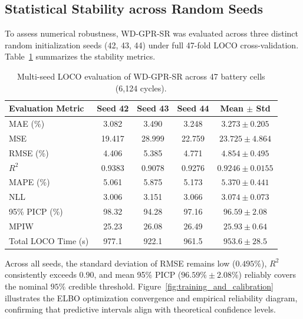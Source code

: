 \documentclass[a4paper,fleqn]{cas-sc}
\begin{document}
\subsection{Statistical Stability across Random Seeds}
To assess numerical robustness, WD-GPR-SR was evaluated across three distinct random initialization seeds (42, 43, 44) under full 47-fold LOCO cross-validation. Table~\ref{tab:seed_metrics} summarizes the stability metrics.

\begin{table}[htbp]
\centering
\caption{Multi-seed LOCO evaluation of WD-GPR-SR across 47 battery cells (6,124 cycles).}
\label{tab:seed_metrics}
\footnotesize
\renewcommand{\arraystretch}{1.15}
\begin{tabular*}{\linewidth}{@{\extracolsep{\fill}}lcccc@{}}
\toprule
\textbf{Evaluation Metric} & \textbf{Seed 42} & \textbf{Seed 43} & \textbf{Seed 44} & \textbf{Mean $\pm$ Std} \\
\midrule
MAE (\%) & 3.082 & 3.490 & 3.248 & $3.273 \pm 0.205$ \\
MSE & 19.417 & 28.999 & 22.759 & $23.725 \pm 4.864$ \\
RMSE (\%) & 4.406 & 5.385 & 4.771 & $4.854 \pm 0.495$ \\
$R^2$ & 0.9383 & 0.9078 & 0.9276 & $0.9246 \pm 0.0155$ \\
MAPE (\%) & 5.061 & 5.875 & 5.173 & $5.370 \pm 0.441$ \\
NLL & 3.006 & 3.151 & 3.066 & $3.074 \pm 0.073$ \\
95\% PICP (\%) & 98.32 & 94.28 & 97.16 & $96.59 \pm 2.08$ \\
MPIW & 25.23 & 26.08 & 26.49 & $25.93 \pm 0.64$ \\
Total LOCO Time (s) & 977.1 & 922.1 & 961.5 & $953.6 \pm 28.5$ \\
\bottomrule
\end{tabular*}
\end{table}

Across all seeds, the standard deviation of RMSE remains low ($0.495\%$), $R^2$ consistently exceeds $0.90$, and mean 95\% PICP ($96.59\% \pm 2.08\%$) reliably covers the nominal $95\%$ credible threshold. Figure~\ref{fig:training_and_calibration} illustrates the ELBO optimization convergence and empirical reliability diagram, confirming that predictive intervals align with theoretical confidence levels.
\end{document}
